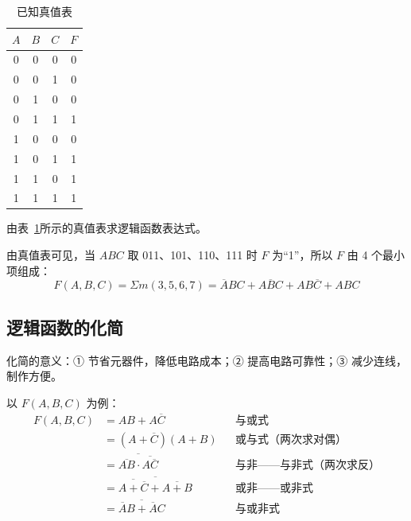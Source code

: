 \begin{table}[H]
\centering
\caption{已知真值表}
\label{tab:真值表:例F3}
\begin{tabular}{ccc|c}
	\toprule
	$A$ & $B$ & $C$ & $F$ \\
	\midrule
	0 & 0 & 0 & 0 \\
	0 & 0 & 1 & 0 \\
	0 & 1 & 0 & 0 \\
	0 & 1 & 1 & 1 \\
	1 & 0 & 0 & 0 \\
	1 & 0 & 1 & 1 \\
	1 & 1 & 0 & 1 \\
	1 & 1 & 1 & 1 \\
	\bottomrule
\end{tabular}
\end{table}

\begin{example}[由真值表写逻辑函数式]
\label{ex:真值表写函数}
由表~\ref{tab:真值表:例F3}所示的真值表求逻辑函数表达式。

\begin{solution}
	由真值表可见，当 $ABC$ 取 011、101、110、111 时 $F$ 为“1”，所以 $F$ 由 4 个最小项组成：
	\begin{equation}
		F(A,B,C)=\Sigma m(3,5,6,7)
		=\overline{A}BC+A\overline{B}C+AB\overline{C}+ABC
		\label{eq:真值表:观察法结果}
	\end{equation}
\end{solution}
\end{example}

\subsection{逻辑函数的化简}
\label{sec:逻辑函数的化简}

化简的意义：① 节省元器件，降低电路成本；② 提高电路可靠性；③ 减少连线，制作方便。

\begin{definition}[逻辑函数的几种常用表达式]
\label{def:常用表达式}
以 $F(A,B,C)$ 为例：
\begin{equation}
	\begin{aligned}
		F(A,B,C)&=AB+A\overline{C} &&\text{与或式}\\
		&=(A+\overline{C})(A+B) &&\text{或与式（两次求对偶）}\\
		&=\overline{\overline{AB}\cdot\overline{A\overline{C}}} &&\text{与非——与非式（两次求反）}\\
		&=\overline{\overline{A+\overline{C}}+\overline{A+B}} &&\text{或非——或非式}\\
		&=\overline{\overline{A}B+\overline{A}C} &&\text{与或非式}
	\end{aligned}
	\label{eq:化简:常用表达式}
\end{equation}
\end{definition}

